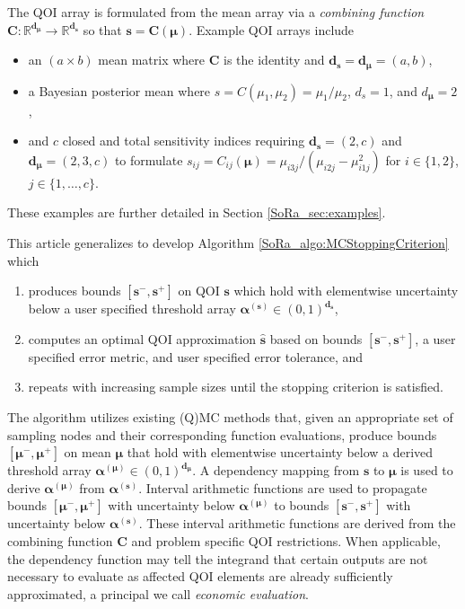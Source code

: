 \documentclass[graybox]{svmult}
\begin{document}
The QOI array is formulated from the mean array via a \emph{combining function} $\boldsymbol{C}: \mathbb{R}^{\boldsymbol{d}_{\boldsymbol{\mu}}} \to \mathbb{R}^{\boldsymbol{d}_{\boldsymbol{s}}}$ so that $\boldsymbol{s} = \boldsymbol{C}(\boldsymbol{\mu})$.
Example QOI arrays include
\begin{itemize}
    \item an $(a \times b)$ mean matrix where $\boldsymbol{C}$ is the identity and $\boldsymbol{d}_{\boldsymbol{s}} = \boldsymbol{d}_{\boldsymbol{\mu}} = (a,b)$,
    \item a Bayesian posterior mean where $s = C(\mu_1,\mu_2) = \mu_1/\mu_2$, $d_s = 1$, and $d_{\boldsymbol{\mu}} = 2$,
    \item and $c$ closed and total sensitivity indices requiring $\boldsymbol{d}_{\boldsymbol{s}} = (2,c)$ and $\boldsymbol{d}_{\boldsymbol{\mu}} = (2,3,c)$ to formulate $s_{ij} = C_{ij}(\boldsymbol{\mu}) =  \mu_{i3j}/(\mu_{i2j}-\mu_{i1j}^2)$ for $i \in \{1,2\}$, $j \in \{1,\dots,c\}$.
\end{itemize}
These examples are further detailed in Section \ref{SoRa_sec:examples}.

This article generalizes \cite{adaptive_qmc} to develop Algorithm \ref{SoRa_algo:MCStoppingCriterion} which 
\begin{enumerate}
    \item produces bounds $[\boldsymbol{s}^-,\boldsymbol{s}^+]$ on QOI $\boldsymbol{s}$ which hold with elementwise uncertainty below a user specified threshold array $\boldsymbol{\alpha}^{(\boldsymbol{s})} \in (0,1)^{\boldsymbol{d}_{\boldsymbol{s}}}$, 
    \item computes an optimal QOI approximation $\hat{\boldsymbol{s}}$ based on bounds $[\boldsymbol{s}^-,\boldsymbol{s}^+]$, a user specified error metric, and user specified error tolerance, and
    \item repeats with increasing sample sizes until the stopping criterion is satisfied. 
\end{enumerate}
The algorithm utilizes existing (Q)MC methods that, given an appropriate set of sampling nodes and their corresponding function evaluations, produce bounds $[\boldsymbol{\mu}^-,\boldsymbol{\mu}^+]$ on mean $\boldsymbol{\mu}$ that hold with elementwise uncertainty below a derived threshold array $\boldsymbol{\alpha}^{(\boldsymbol{\mu})} \in (0,1)^{\boldsymbol{d}_{\boldsymbol{\mu}}}$. A dependency mapping from $\boldsymbol{s}$ to $\boldsymbol{\mu}$ is used to derive $\boldsymbol{\alpha}^{(\boldsymbol{\mu})}$ from $\boldsymbol{\alpha}^{(\boldsymbol{s})}$. Interval arithmetic functions are used to propagate bounds $[\boldsymbol{\mu}^-,\boldsymbol{\mu}^+]$ with uncertainty below $\boldsymbol{\alpha}^{(\boldsymbol{\mu})}$ to bounds  $[\boldsymbol{s}^-,\boldsymbol{s}^+]$ with uncertainty below $\boldsymbol{\alpha}^{(\boldsymbol{s})}$. These interval arithmetic functions are derived from the combining function $\boldsymbol{C}$ and problem specific QOI restrictions. When applicable, the dependency function may tell the integrand that certain outputs are not necessary to evaluate as affected QOI elements are already sufficiently approximated, a principal we call \emph{economic evaluation}. 
\end{document}
